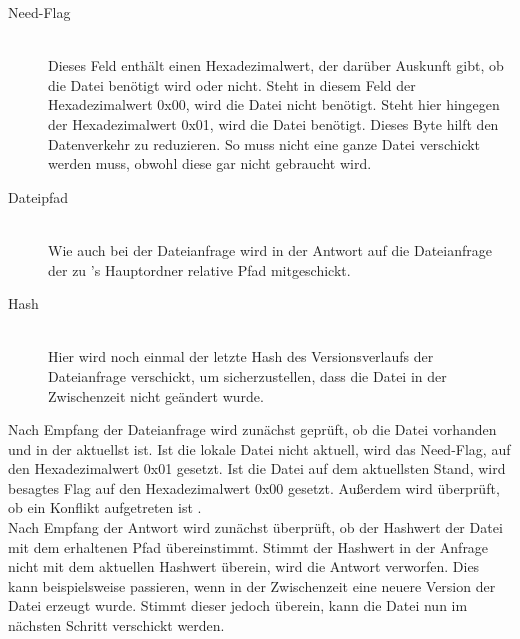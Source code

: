\begin{description}
	\item[{Need-Flag}] \hfill \\
		Dieses Feld enthält einen Hexadezimalwert, der darüber Auskunft gibt, ob die Datei benötigt wird oder nicht. Steht in diesem Feld der Hexadezimalwert 0x00, wird die Datei nicht benötigt. Steht hier hingegen der Hexadezimalwert 0x01, wird die Datei benötigt. Dieses Byte hilft den Datenverkehr zu reduzieren. So muss nicht eine ganze Datei verschickt werden muss, obwohl diese gar nicht gebraucht wird.
	\item[{Dateipfad}] \hfill \\
		Wie auch bei der Dateianfrage wird in der Antwort auf die Dateianfrage der zu \sblit's Hauptordner relative Pfad mitgeschickt.
	\item[{Hash}] \hfill \\
		Hier wird noch einmal der letzte Hash des Versionsverlaufs der Dateianfrage verschickt, um sicherzustellen, dass die Datei in der Zwischenzeit nicht geändert wurde. 
\end{description}
Nach Empfang der Dateianfrage wird zunächst geprüft, ob die Datei vorhanden und in der aktuellst ist.  Ist die lokale Datei nicht aktuell, wird das Need-Flag, auf den Hexadezimalwert 0x01 gesetzt. Ist die Datei auf dem aktuellsten Stand, wird besagtes Flag auf den Hexadezimalwert 0x00 gesetzt. Außerdem wird überprüft, ob ein Konflikt aufgetreten ist .\\
Nach Empfang der Antwort wird zunächst überprüft, ob der Hashwert der Datei mit dem erhaltenen Pfad übereinstimmt. Stimmt der Hashwert in der Anfrage nicht mit dem aktuellen Hashwert überein, wird die Antwort verworfen. Dies kann beispielsweise passieren, wenn in der Zwischenzeit eine neuere Version der Datei erzeugt wurde. Stimmt dieser jedoch überein, kann die Datei nun im nächsten Schritt verschickt werden.
		
